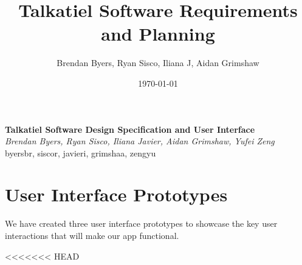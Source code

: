 \documentclass[12pt]{article}
\title{Talkatiel Software Requirements and Planning}
\author{Brendan Byers, Ryan Sisco, Iliana J, Aidan Grimshaw}
\date{\today}
\begin{document}
\begin{center}
      \Large\textbf{Talkatiel Software Design Specification and User Interface}\\
      \large\textit{Brendan Byers, Ryan Sisco, Iliana Javier, Aidan Grimshaw, Yufei Zeng}\\
      \large{byersbr, siscor, javieri, grimshaa, zengyu}\\
   \end{center}

\tableofcontents

\section{User Interface Prototypes}
We have created three user interface prototypes to showcase the key user interactions that will make our app functional.

<<<<<<< HEAD
\end{document}
